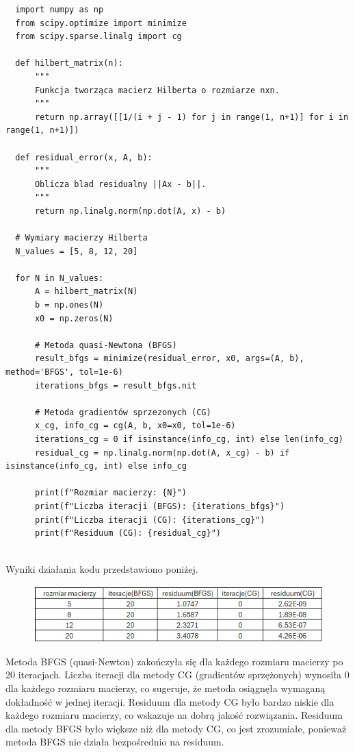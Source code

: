 \documentclass{article}
\begin{document}
\begin{lstlisting}
  import numpy as np
  from scipy.optimize import minimize
  from scipy.sparse.linalg import cg
  
  def hilbert_matrix(n):
      """
      Funkcja tworząca macierz Hilberta o rozmiarze nxn.
      """
      return np.array([[1/(i + j - 1) for j in range(1, n+1)] for i in range(1, n+1)])
  
  def residual_error(x, A, b):
      """
      Oblicza blad residualny ||Ax - b||.
      """
      return np.linalg.norm(np.dot(A, x) - b)
  
  # Wymiary macierzy Hilberta
  N_values = [5, 8, 12, 20]
  
  for N in N_values:
      A = hilbert_matrix(N)
      b = np.ones(N)
      x0 = np.zeros(N)
      
      # Metoda quasi-Newtona (BFGS)
      result_bfgs = minimize(residual_error, x0, args=(A, b), method='BFGS', tol=1e-6)
      iterations_bfgs = result_bfgs.nit
      
      # Metoda gradientów sprzezonych (CG)
      x_cg, info_cg = cg(A, b, x0=x0, tol=1e-6)
      iterations_cg = 0 if isinstance(info_cg, int) else len(info_cg)
      residual_cg = np.linalg.norm(np.dot(A, x_cg) - b) if isinstance(info_cg, int) else info_cg
      
      print(f"Rozmiar macierzy: {N}")
      print(f"Liczba iteracji (BFGS): {iterations_bfgs}")
      print(f"Liczba iteracji (CG): {iterations_cg}")
      print(f"Residuum (CG): {residual_cg}")
  
\end{lstlisting}

Wyniki działania kodu przedstawiono poniżej.

\begin{figure}[h]
 \includegraphics[scale=0.7]{zad7.jpg}
  \centering
\end{figure}

Metoda BFGS (quasi-Newton) zakończyła się dla każdego rozmiaru macierzy po 20 iteracjach.
Liczba iteracji dla metody CG (gradientów sprzężonych) wynosiła 0 dla każdego rozmiaru macierzy, co sugeruje, 
że metoda osiągnęła wymaganą dokładność w jednej iteracji.
Residuum dla metody CG było bardzo niskie dla każdego rozmiaru macierzy, 
co wskazuje na dobrą jakość rozwiązania.
Residuum dla metody BFGS było większe niż dla metody CG, co jest zrozumiałe, 
ponieważ metoda BFGS nie działa bezpośrednio na residuum.
\end{document}

